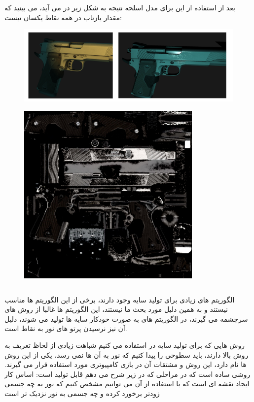 \documentclass[a4paper, 12pt]{book}
\begin{document}
      بعد از استفاده از این  برای مدل اسلحه نتیجه به شکل زیر در می آید، می بینید که مقدار یازتاب در همه نقاط یکسان نیست:

\begin{figure}[ht]
    \centering
    \href{https://github.com/devprofile98/shm}{
        \includegraphics[width=15cm]{images/specular-gun.png}
    }
    \caption{}
    \label{fig:my_label}
\end{figure}  
  
\begin{figure}[H]
    \centering
    \href{https://github.com/devprofile98/shm}{
        \includegraphics[width=9cm]{images/handgun-S.jpg}
    }
    \caption{}
    \label{fig:my_label}
\end{figure}

\newpage

\subsection*{}
    الگوریتم های زیادی برای تولید سایه وجود دارند، برخی از این الگوریتم ها مناسب  نیستند و به همین دلیل مورد بحث ما نیستند، این الگوریتم ها غالبا از روش های  سرچشمه می گیرند، در الگوریتم های  به صورت خودکار سایه ها تولید می شوند، دلیل آن نیز نرسیدن پرتو های نور به نقاط است.\par
    روش هایی که برای تولید سایه در  استفاده می کنیم شباهت زیادی از لحاظ تعریف به روش بالا دارند، باید سطوحی را پیدا کنیم که نور به آن ها نمی رسد، یکی از این روش ها  نام دارد، این روش و مشتقات آن در بازی کامپیوتری مورد استفاده قرار می گیرند.  روشی ساده است که در مراحلی که در زیر شرح می دهم قابل تولید است: اساس کار ایجاد نقشه ای است که با استفاده از آن می توانیم مشخص کنیم که نور به چه جسمی زودتر برخورد کرده و چه جسمی به نور نزدیک تر است
\end{document}
